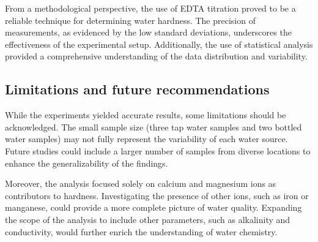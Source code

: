 \documentclass{article}
\begin{document}
From a methodological perspective, the use of EDTA titration proved to be a reliable technique for determining water hardness. The precision of measurements, as evidenced by the low standard deviations, underscores the effectiveness of the experimental setup. Additionally, the use of statistical analysis provided a comprehensive understanding of the data distribution and variability.

\subsection{Limitations and future recommendations}
While the experiments yielded accurate results, some limitations should be acknowledged. The small sample size (three tap water samples and two bottled water samples) may not fully represent the variability of each water source. Future studies could include a larger number of samples from diverse locations to enhance the generalizability of the findings.

Moreover, the analysis focused solely on calcium and magnesium ions as contributors to hardness. Investigating the presence of other ions, such as iron or manganese, could provide a more complete picture of water quality. Expanding the scope of the analysis to include other parameters, such as alkalinity and conductivity, would further enrich the understanding of water chemistry.
\end{document}
